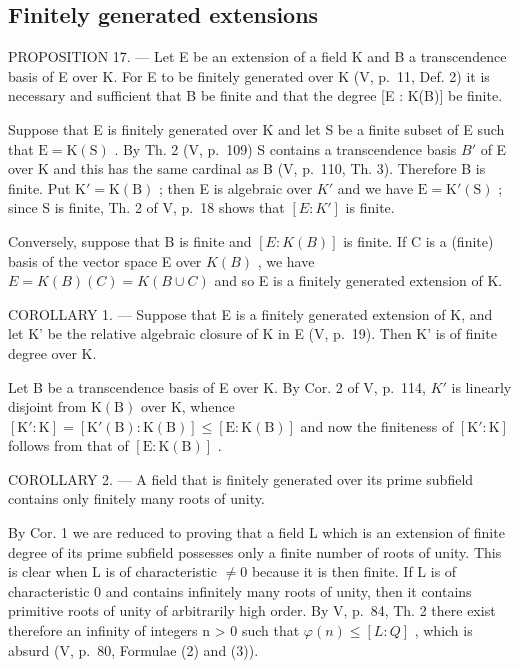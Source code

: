 \subsection{Finitely generated extensions}

PROPOSITION 17. --- Let E be an extension of a field K and B a transcendence basis of E over K. For E to be finitely generated over K (V, p.~11, Def. 2) it is necessary and sufficient that B be finite and that the degree {[}E : K(B){]} be finite.

Suppose that E is finitely generated over K and let S be a finite subset of E such that \(\mathrm{E} = \mathrm{K}(\mathrm{S})\) . By Th. 2 (V, p.~109) S contains a transcendence basis \(B'\) of E over K and this has the same cardinal as B (V, p.~110, Th. 3). Therefore B is finite. Put \(\mathrm{K}' = \mathrm{K}(\mathrm{B})\) ; then E is algebraic over \(K'\) and we have \(\mathrm{E} = \mathrm{K}'(\mathrm{S})\) ; since S is finite, Th. 2 of V, p.~18 shows that \([E : K']\) is finite.

Conversely, suppose that B is finite and \([E:K(B)]\) is finite. If C is a (finite) basis of the vector space E over \(K(B)\) , we have \(E = K(B)(C) = K(B \cup C)\) and so E is a finitely generated extension of K.

COROLLARY 1. --- Suppose that E is a finitely generated extension of K, and let K' be the relative algebraic closure of K in E (V, p.~19). Then K' is of finite degree over K.

Let B be a transcendence basis of E over K. By Cor. 2 of V, p.~114, \(K'\) is linearly disjoint from \(\mathrm{K}(\mathrm{B})\) over K, whence \([\mathrm{K}' : \mathrm{K}] = [\mathrm{K}'(\mathrm{B}) : \mathrm{K}(\mathrm{B})] \leq [\mathrm{E} : \mathrm{K}(\mathrm{B})]\) and now the finiteness of \([\mathrm{K}' : \mathrm{K}]\) follows from that of \([\mathrm{E} : \mathrm{K}(\mathrm{B})]\) .

COROLLARY 2. --- A field that is finitely generated over its prime subfield contains only finitely many roots of unity.

By Cor. 1 we are reduced to proving that a field L which is an extension of finite degree of its prime subfield possesses only a finite number of roots of unity. This is clear when L is of characteristic \(\neq0\) because it is then finite. If L is of characteristic 0 and contains infinitely many roots of unity, then it contains primitive roots of unity of arbitrarily high order. By V, p.~84, Th. 2 there exist therefore an infinity of integers n \textgreater{} 0 such that \(\varphi(n) \leqslant [L : Q]\) , which is absurd (V, p.~80, Formulae (2) and (3)).


